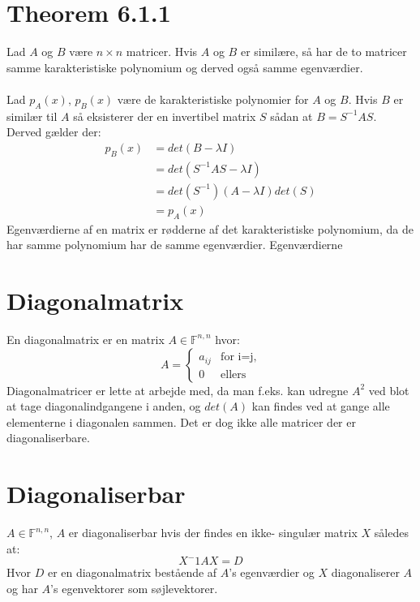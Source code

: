 \documentclass[a4paper,oneside,article]{memoir}
\begin{document}
	\section{Theorem 6.1.1}
	Lad $A$ og $B$ være $n \times n$ matricer. Hvis $A$ og $B$
	er similære, så har de to matricer samme karakteristiske
	polynomium og derved også samme egenværdier.
	\\
	\\
	Lad $p_A(x),\, p_B(x)$ være de karakteristiske 
	polynomier for $A$ og $B$. Hvis $B$ er similær til $A$
	så eksisterer der en invertibel matrix $S$ sådan
	at $B=S^{-1}AS$. Derved gælder der:
	\begin{align*}
	p_B(x)&=det(B-\lambda I)\\
	&=det(S^{-1}AS-\lambda I)\\
	&=det(S^{-1})(A-\lambda I)det(S)\\
	&=p_A(x)
	\end{align*}
	Egenværdierne af en matrix er rødderne af det karakteristiske
	polynomium, da de har samme polynomium har de samme egenværdier.
	Egenværdierne 
	
	\section{Diagonalmatrix}
	En diagonalmatrix er en matrix $A\in \mathbb{F}^{n,n}$ hvor:
	$$A = \left\{ \begin{array}{ll}
	         a_{ij} & \mbox{for i=j},\\
	        0 & \mbox{ellers}\end{array} \right.$$
	Diagonalmatricer er lette at arbejde med, da man f.eks. kan udregne 
	$A^2$ ved blot at tage diagonalindgangene i anden, og $det(A)$ kan
	findes ved at gange alle elementerne i diagonalen sammen. Det er 
	dog ikke alle matricer der er diagonaliserbare.
	
	\section{Diagonaliserbar}
	$A\in \mathbb{F}^{n,n}$, $A$ er diagonaliserbar hvis der findes en ikke-
	singulær matrix $X$ således at:
	$$X^-1AX=D$$
	Hvor $D$ er en diagonalmatrix bestående af $A$'s egenværdier og $X$ 
	diagonaliserer $A$ og har $A$'s egenvektorer som søjlevektorer.
	
\end{document}
